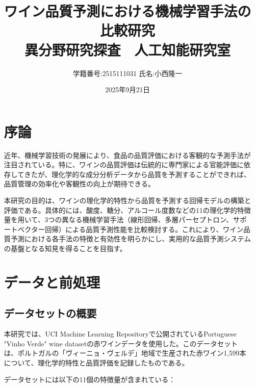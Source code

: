 \documentclass[12pt,a4paper,dvipdfmx]{jsarticle}
\title{ワイン品質予測における機械学習手法の比較研究\\
{\large 異分野研究探査　人工知能研究室}}
\author{学籍番号:2515111031
氏名:小西隆一}
\date{2025年9月21日}
\begin{document}
\maketitle

\section{序論}

近年、機械学習技術の発展により、食品の品質評価における客観的な予測手法が注目されている。\cite{Yang2025}特に、ワインの品質評価は伝統的に専門家による官能評価に依存してきたが、理化学的な成分分析データから品質を予測することができれば、品質管理の効率化や客観性の向上が期待できる。

本研究の目的は、ワインの理化学的特性から品質を予測する回帰モデルの構築と評価である。具体的には、酸度、糖分、アルコール度数などの11の理化学的特徴量を用いて、3つの異なる機械学習手法（線形回帰、多層パーセプトロン、サポートベクター回帰）による品質予測性能を比較検討する。これにより、ワイン品質予測における各手法の特徴と有効性を明らかにし、実用的な品質予測システムの基盤となる知見を得ることを目指す。

\section{データと前処理}

\subsection{データセットの概要}

本研究では、UCI Machine Learning Repositoryで公開されているPortuguese "Vinho Verde" wine dataset\cite{Cortez2009}\cite{UCIWineQuality}の赤ワインデータを使用した。このデータセットは、ポルトガルの「ヴィーニョ・ヴェルデ」地域で生産された赤ワイン1,599本について、理化学的特性と品質評価を記録したものである。

データセットには以下の11個の特徴量が含まれている：
\end{document}
